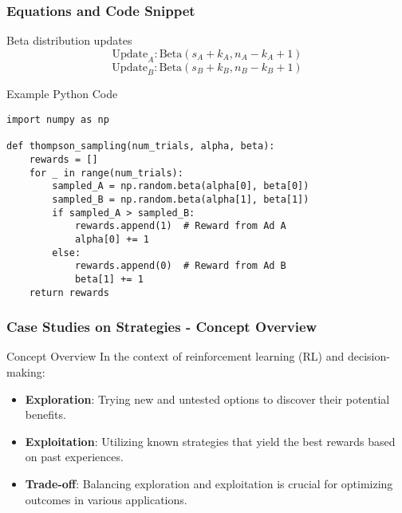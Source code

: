 \documentclass[aspectratio=169]{beamer}
\begin{document}
\begin{frame}[fragile]
    \frametitle{Equations and Code Snippet}
    \begin{block}{Beta distribution updates}
        \begin{equation}
            \text{Update}_A: \text{Beta}(s_A + k_A, n_A - k_A + 1)
        \end{equation}
        \begin{equation}
            \text{Update}_B: \text{Beta}(s_B + k_B, n_B - k_B + 1)
        \end{equation}
    \end{block}

    \begin{block}{Example Python Code}
        \begin{lstlisting}
import numpy as np

def thompson_sampling(num_trials, alpha, beta):
    rewards = []
    for _ in range(num_trials):
        sampled_A = np.random.beta(alpha[0], beta[0])
        sampled_B = np.random.beta(alpha[1], beta[1])
        if sampled_A > sampled_B:
            rewards.append(1)  # Reward from Ad A
            alpha[0] += 1
        else:
            rewards.append(0)  # Reward from Ad B
            beta[1] += 1
    return rewards
        \end{lstlisting}
    \end{block}
\end{frame}

\begin{frame}[fragile]
    \frametitle{Case Studies on Strategies - Concept Overview}
    \begin{block}{Concept Overview}
        In the context of reinforcement learning (RL) and decision-making:
        \begin{itemize}
            \item \textbf{Exploration}: Trying new and untested options to discover their potential benefits.
            \item \textbf{Exploitation}: Utilizing known strategies that yield the best rewards based on past experiences.
            \item \textbf{Trade-off}: Balancing exploration and exploitation is crucial for optimizing outcomes in various applications.
        \end{itemize}
    \end{block}
\end{frame}
\end{document}
